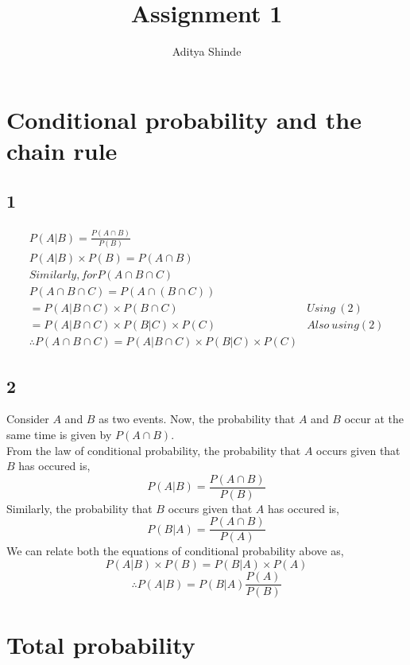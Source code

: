 \documentclass[10pt,a4paper]{article}
\begin{document}
\title{Assignment 1}
\author{Aditya Shinde}
\maketitle

\section{Conditional probability and the chain rule}
\subsection*{1}
\begin{align}
& P\left(A|B\right) =\frac{P\left(A \cap B\right)}{P\left(B\right)} & \\
& P\left(A|B\right)\times P\left(B\right)=P\left(A \cap B\right) &\\
& Similarly, for P\left(A \cap B \cap C \right) &\\
& P\left(A \cap B \cap C \right)=P\left(A \cap \left( B \cap C \right) \right) & \\
& = P\left(A | B \cap C \right) \times P\left(B \cap C\right)  & Using\ (2)& \\
& = P\left(A | B \cap C \right) \times P\left(B | C\right) \times P\left(C\right)  & Also\ using (2)& \\
& \therefore P\left(A \cap B \cap C \right)=P\left(A | B \cap C \right) \times P\left(B | C\right) \times P\left(C\right)
\end{align}
\subsection*{2}
Consider $A$ and $B$ as two events. Now, the probability that $A$ and $B$ occur at the same time is given by $P\left(A \cap B\right)$.\\
From the law of conditional probability, the probability that $A$ occurs given that $B$ has occured is, 
$$P \left( A | B \right) = \frac{P \left( A \cap B \right)}{P\left(B\right)}$$
Similarly, the probability that $B$ occurs given that $A$ has occured is, 
$$P \left( B | A \right) = \frac{P \left( A \cap B \right)}{P\left(A\right)}$$
We can relate both the equations of conditional probability above as,
$$P \left( A | B \right) \times P\left(B\right) = P \left( B | A \right) \times P\left(A\right)$$
$$\therefore P \left( A | B \right) = P \left( B | A \right) \frac{P\left(A\right)}{P\left(B\right)}$$
\newpage
\section{Total probability}
\end{document}
